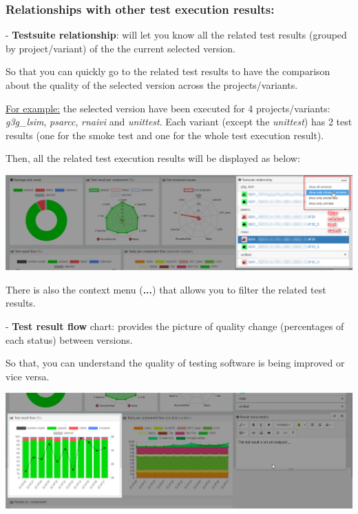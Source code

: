 \subsubsection{Relationships with other test execution results:}

- \textbf{Testsuite relationship}: will let you know all the related test 
results (grouped by project/variant) of the the current selected version.

So that you can quickly go to the related test results to have the comparison
about the quality of the selected version across the projects/variants.

\underline{For example:} the selected version have been executed for 4 
projects/variants: \emph{g3g\_lsim}, \emph{psarcc}, \emph{rnaivi} and 
\emph{unittest}. Each variant (except the \emph{unittest}) has 2 test results 
(one for the smoke test and one for the whole test execution result).

Then, all the related test execution results will be displayed as below:

\includegraphics[width=1\linewidth]
{./pictures/dashboard/testsuite_relationship.png}

There is also the context menu (\textbf{...}) that allows you to filter the 
related test results.

- \textbf{Test result flow} chart: provides the picture of quality change 
(percentages of each status) between versions. 

So that, you can understand the quality of testing software is being improved 
or vice versa.

\includegraphics[width=1\linewidth]
{./pictures/dashboard/chart_test_result_flow.png}

